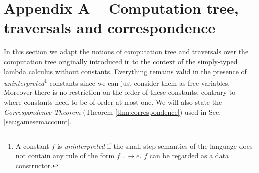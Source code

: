 \documentclass{llncs}
\begin{document}
%
%
%
%
%
%
%
%
%
%


\section*{Appendix A -- Computation tree, traversals and correspondence}
\label{sec:correspondence}

In this section we adapt the notions of computation tree and
traversals over the computation tree originally introduced in
\cite{OngLics2006} to the context of the simply-typed
lambda calculus without constants. Everything remains valid in the
presence of \emph{uninterpreted}\footnote{A constant $f$ is
  \emph{uninterpreted} if the small-step semantics of the language
  does not contain any rule of the form $f \dots \rightarrow e$. $f$
  can be regarded as a data constructor.}  constants since we can just
consider them as free variables. Moreover there is no restriction on
the order of these constants, contrary to \cite{OngLics2006} where
constants need to be of order at most one. We will also state the
\emph{Correspondence Theorem} (Theorem \ref{thm:correspondence}) used
in Sec. \ref{sec:gamesemaccount}. 
\end{document}
